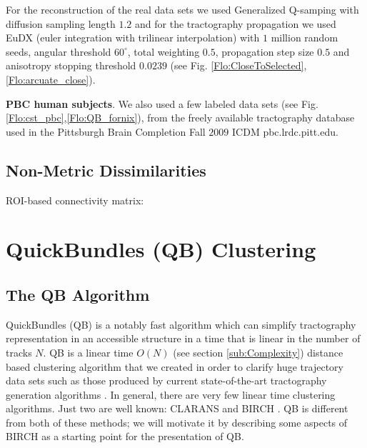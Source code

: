 \documentclass[preprint,authoryear,a4paper,10pt,onecolumn]{elsarticle}
\begin{document}
For the reconstruction of the real data sets we used Generalized
Q-samping with diffusion sampling length $1.2$ and for the tractography
propagation we used EuDX (euler integration with trilinear
interpolation) with $1$ million random seeds, angular threshold
$60^{\circ}$, total weighting $0.5$, propagation step size $0.5$ and
anisotropy stopping threshold $0.0239$ (see
Fig. \ref{Flo:CloseToSelected},\ref{Flo:arcuate_close}).

\textbf{PBC human subjects}. We also used a few labeled data sets (see
Fig.\ref{Flo:cst_pbc},\ref{Flo:QB_fornix}), from the freely available
tractography database used in the Pittsburgh Brain Completion Fall
$2009$ ICDM pbc.lrdc.pitt.edu.

\subsection{Non-Metric Dissimilarities}

ROI-based connectivity matrix: \citep{ElKouby2005}

\section{QuickBundles (QB) Clustering}

\subsection{The QB Algorithm}

QuickBundles (QB) is a notably fast algorithm which can simplify
tractography representation in an accessible structure in a time that is
linear in the number of tracks $N$. QB is a linear time $O(N)$ (see
section \ref{sub:Complexity}) distance based clustering algorithm that
we created in order to clarify huge trajectory data sets such as those
produced by current state-of-the-art tractography generation algorithms
\cite{Parker2003,WWS+08}. In general, there are very few linear time
clustering algorithms. Just two are well known: CLARANS
\cite{ng2002clarans} and BIRCH \cite{zhang1997birch}. QB is different
from both of these methods; we will motivate it by describing some
aspects of BIRCH as a starting point for the presentation of QB.
\end{document}
